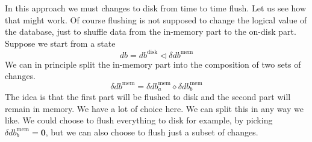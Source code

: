 \documentclass[11pt,a4paper]{article}
\begin{document}
In this approach we must changes to disk from time to time flush. Let us see
how that might work. Of course flushing is not supposed to change the logical
value of the database, just to shuffle data from the in-memory part to the
on-disk part. Suppose we start from a state
\[
\mathit{db} = \mathit{db}^{\mathrm{disk}}
      \triangleleft \delta\mathit{db}^{\mathrm{mem}}
\]
We can in principle split the in-memory part into the composition of two sets
of changes.
\[
\delta\mathit{db}^{\mathrm{mem}} = \delta\mathit{db}^{\mathrm{mem}}_a \diamond \delta\mathit{db}^{\mathrm{mem}}_b
\]
The idea is that the first part will be flushed to disk and the second part
will remain in memory. We have a lot of choice here. We can split this in any
way we like. We could choose to flush everything to disk for example, by picking
$\delta\mathit{db}^{\mathrm{mem}}_b = \mathbf{0}$, but we can also choose to
flush just a subset of changes.
\end{document}
